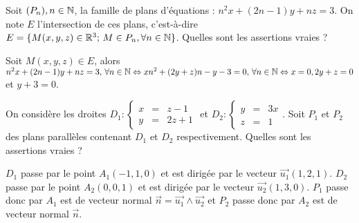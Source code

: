 \begin{question} 

Soit $(P_n), n\in \mathbb{N}$, la famille de plans d'équations : $n^2x+(2n-1)y+nz=3$. On note $E$ l'intersection de ces plans, c'est-à-dire $E= \{M(x,y,z) \in \mathbb{R}^3; \, M\in P_n, \forall n\in \mathbb{N} \}$. Quelles sont les assertions vraies ?
\begin{answers}

 
    
   
   
\end{answers}
\begin{explanations}
Soit $M(x,y,z) \in E$, alors   $n^2x+(2n-1)y+nz=3, \, \forall n \in \mathbb{N}  \Leftrightarrow  xn^2+ (2y+z)n-y-3=0, \, \forall n \in \mathbb{N}  \Leftrightarrow  x=0, 2y+z=0$ et $y+3=0$.
\end{explanations}

\end{question}


\begin{question} 

On considère les droites $D_1 : \left\{\begin{array}{ccl}x&=&z-1\\y&=&2z+1 \end{array}\right.$ et  
$D_2 : \left\{\begin{array}{ccl}y&=&3x\\z&=&1 \end{array}\right.$. Soit $P_1$ et $P_2$ des plans parallèles contenant $D_1$ et $D_2$ respectivement.    Quelles sont les assertions vraies ?
\begin{answers}

 
    
   
   
\end{answers}
\begin{explanations}
$D_1$ passe par le point $A_1(-1,1,0)$ et est dirigée par le vecteur $\vec{u_1}(1,2,1)$. 
$D_2$ passe par le point $A_2(0,0,1)$ et est dirigée par le vecteur $\vec{u_2}(1,3,0)$. $P_1$ passe donc par $A_1$ est de vecteur normal  $\vec{n}=\vec{u_1} \wedge \vec{u_2}$ et $P_2$ passe donc par $A_2$ est de vecteur normal  $\vec{n}$.
\end{explanations}

\end{question}


